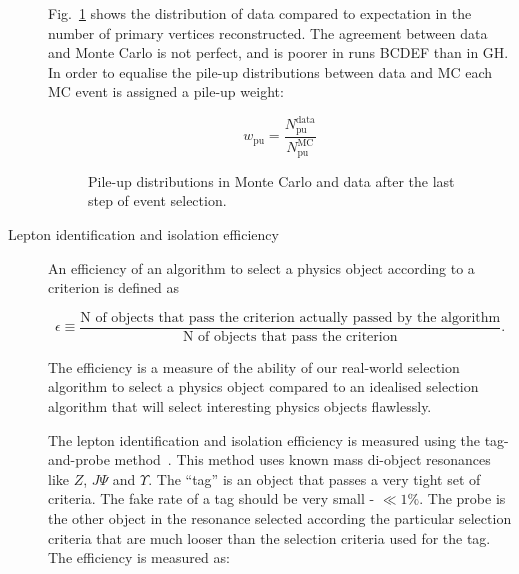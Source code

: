 \begin{description}
Fig.~\ref{fig:L4_1l4j2b2w_nvtx} shows the distribution of data compared to expectation in the number of primary vertices reconstructed. The agreement between data and Monte Carlo is not perfect, and is poorer in runs BCDEF than in GH. In order to equalise the pile-up distributions between data and MC each MC event is assigned a pile-up weight:

\begin{equation}
w_{\text{pu}}=\frac{N^{\text{data}}_{\text{pu}}}{N^{\text{MC}}_{\text{pu}}}
\end{equation}

\begin{figure}[htp]
\centering
  \def\twidth{0.45}
  \centering
  \hfil
\caption{Pile-up distributions in Monte Carlo and data after the last step of event selection. }
\label{fig:L4_1l4j2b2w_nvtx}
\end{figure}


\item[Lepton identification and isolation efficiency]

An efficiency of an algorithm to select a physics object according to a criterion is defined as 

\begin{equation}
\epsilon\equiv\frac{\text{N of objects that pass the criterion actually passed by the algorithm}}{\text{N of objects that pass the criterion}}.
\end{equation}

The efficiency is a measure of the ability of our real-world selection algorithm to select a physics object compared to an idealised selection algorithm that will select interesting physics objects flawlessly.

The lepton identification and isolation efficiency is measured using the tag-and-probe method~\cite{CMS-AN-2009-111}. This method uses known mass di-object resonances like $Z$, $J\Psi$ and $\Upsilon$. The ``tag'' is an object that passes a very tight set of criteria. The fake rate of a tag should be very small - $\ll 1\%$. The probe is the other object in the resonance selected according the particular selection criteria that are much looser than the selection criteria used for the tag. The efficiency is measured as:


\end{description}
